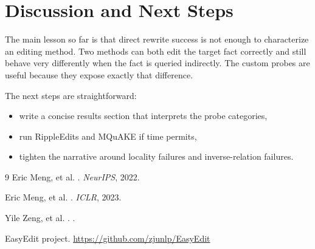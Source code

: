 \documentclass[11pt]{article}
\begin{document}
\section*{Discussion and Next Steps}
The main lesson so far is that direct rewrite success is not enough to characterize an editing method.
Two methods can both edit the target fact correctly and still behave very differently when the fact is queried indirectly.
The custom probes are useful because they expose exactly that difference.

The next steps are straightforward:
\begin{itemize}[leftmargin=*]
  \item write a concise results section that interprets the probe categories,
  \item run RippleEdits and MQuAKE if time permits,
  \item tighten the narrative around locality failures and inverse-relation failures.
\end{itemize}

\begin{thebibliography}{9}
Eric Meng, et al.
.
\newblock \emph{NeurIPS}, 2022.

Eric Meng, et al.
.
\newblock \emph{ICLR}, 2023.

Yile Zeng, et al.
.
.

EasyEdit project.
\newblock \url{https://github.com/zjunlp/EasyEdit}
\end{thebibliography}
\end{document}
